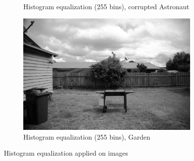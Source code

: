 \documentclass{article}
\begin{document}
\begin{figure}[H]
\begin{subfigure}{0.3\textwidth}
		\caption{Histogram equalization (255 bins), corrupted Astronaut}
	\end{subfigure}
	\hfill
	\begin{subfigure}{0.3\textwidth}
		\includegraphics[width=\textwidth]{Generated/Garden_eqHistOneChannel255bins.png}
		\caption{Histogram equalization (255 bins), Garden}
	\end{subfigure}
	\caption{Histogram equalization applied on images}
	\label{fig:eqHist}
\end{figure}
\end{document}
